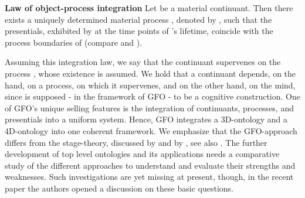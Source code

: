 \documentclass{ao2e}
\begin{document}
{{\bf Law of object-process integration}
Let  be a material continuant. Then there exists a uniquely determined material process , denoted by , such that the presentials, exhibited by  at the time points of 's lifetime, coincide with the process boundaries of  (compare \cite{herre-h-2010-a} and \cite{herre-h-2007-a}).

Assuming this integration law, we say that the continuant  supervenes on the process , whose existence is assumed. We hold that a continuant  depends, on the hand, on a process, on which it supervenes, and on the other hand, on the mind, since  is supposed - in the framework of GFO - to be a cognitive construction. One of GFO's unique selling features is the integration of continuants, processes, and presentials into a uniform system. Hence, GFO integrates a 3D-ontology and a 4D-ontology into one coherent framework. We emphasize that the GFO-approach differs from the stage-theory, discussed by \cite{sider-t-2001-a} and by \cite{lewis-d-1986-a}, see also \cite{heller-b-2004-a}. The further development of top level ontologies and its applications needs a comparative study of the different approaches to understand and evaluate their strengths and weaknesses. Such investigations are yet missing at present, though, in the recent paper \cite{maojo-v-2011-a} the authors
opened a discussion on these basic questions. 

}
\end{document}
